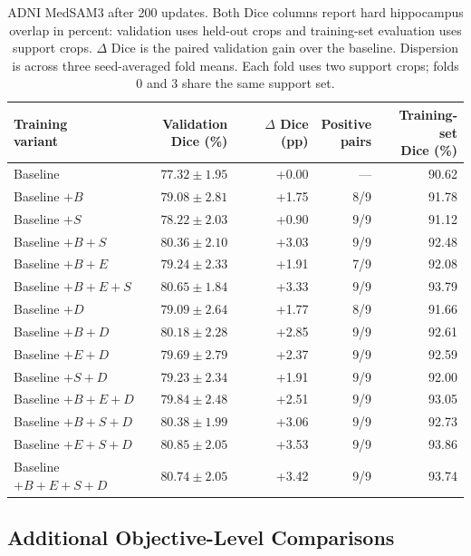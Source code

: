 \documentclass[12pt,a4paper]{article}
\begin{document}
\FloatBarrier
\begin{table}[htbp]
\centering\small{}
\setlength{\tabcolsep}{5pt}
\renewcommand{\arraystretch}{1.15}
\begin{tabular}{@{}lrrrr@{}}
\hline
\shortstack{Training\\variant} & \shortstack{Validation\\Dice (\%)} & \shortstack{$\Delta$ Dice\\(pp)} & \shortstack{Positive\\pairs} & \shortstack{Training-set\\Dice (\%)} \\
\hline
Baseline & $77.32\pm1.95$ & +0.00 & --- & 90.62 \\
Baseline $+B$ & $79.08\pm2.81$ & +1.75 & 8/9 & 91.78 \\
Baseline $+S$ & $78.22\pm2.03$ & +0.90 & 9/9 & 91.12 \\
Baseline $+B+S$ & $80.36\pm2.10$ & +3.03 & 9/9 & 92.48 \\
Baseline $+B+E$ & $79.24\pm2.33$ & +1.91 & 7/9 & 92.08 \\
Baseline $+B+E+S$ & $80.65\pm1.84$ & +3.33 & 9/9 & 93.79 \\
Baseline $+D$ & $79.09\pm2.64$ & +1.77 & 8/9 & 91.66 \\
Baseline $+B+D$ & $80.18\pm2.28$ & +2.85 & 9/9 & 92.61 \\
Baseline $+E+D$ & $79.69\pm2.79$ & +2.37 & 9/9 & 92.59 \\
Baseline $+S+D$ & $79.23\pm2.34$ & +1.91 & 9/9 & 92.00 \\
Baseline $+B+E+D$ & $79.84\pm2.48$ & +2.51 & 9/9 & 93.05 \\
Baseline $+B+S+D$ & $80.38\pm1.99$ & +3.06 & 9/9 & 92.73 \\
Baseline $+E+S+D$ & $80.85\pm2.05$ & +3.53 & 9/9 & 93.86 \\
Baseline $+B+E+S+D$ & $80.74\pm2.05$ & +3.42 & 9/9 & 93.74 \\
\hline
\end{tabular}
\caption{ADNI MedSAM3 after 200 updates. Both Dice columns report hard
hippocampus overlap in percent: validation uses held-out crops and
training-set evaluation uses support crops. $\Delta$ Dice is the paired
validation gain over the baseline. Dispersion is across three
seed-averaged fold means. Each fold uses two support crops; folds 0 and 3
share the same support set.}
\label{tab:medsam-adni-noaug}
\end{table}
\FloatBarrier
\subsection{Additional Objective-Level Comparisons}
\end{document}
